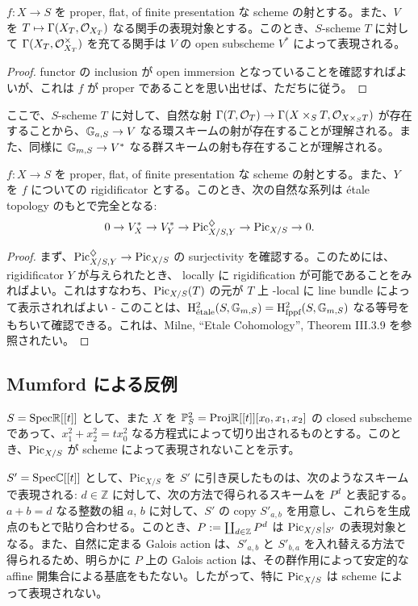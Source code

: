 \begin{prop}
  $f \colon X \to S$ を proper, flat, of finite presentation な scheme の射とする。また、$V$ を $T \mapsto \Gamma(X_T, \mathcal{O}_{X_T})$ なる関手の表現対象とする。このとき、$S$-scheme $T$ に対して $\Gamma(X_T, \mathcal{O}_{X_T}^\times)$ を充てる関手は $V$ の open subscheme $V^*$ によって表現される。
\end{prop}
\begin{proof}
  functor の inclusion が open immersion となっていることを確認すればよいが、これは $f$ が proper であることを思い出せば、ただちに従う。
\end{proof}

ここで、$S$-scheme $T$ に対して、自然な射 $\Gamma(T, \mathcal{O}_T) \to \Gamma(X \times_S T, \mathcal{O}_{X \times_S T})$ が存在することから、$\mathbb{G}_{a,S} \to V$ なる環スキームの射が存在することが理解される。また、同様に $\mathbb{G}_{m,S} \to V^*$ なる群スキームの射も存在することが理解される。

\begin{prop}\label{Prop:Rigid_vs_Natural_Pic}
  $f \colon X \to S$ を proper, flat, of finite presentation な scheme の射とする。また、$Y$ を $f$ についての rigidificator とする。このとき、次の自然な系列は \'{e}tale topology のもとで完全となる: \[0 \to V_X^* \to V_Y^* \to \mathrm{Pic}^\diamondsuit_{X / S, Y} \to \mathrm{Pic}_{X / S} \to 0.\]
\end{prop}
\begin{proof}
  まず、$\mathrm{Pic}^\diamondsuit_{X / S, Y} \to \mathrm{Pic}_{X / S}$ の surjectivity を確認する。このためには、rigidificator $Y$ が与えられたとき、 locally に rigidification が可能であることをみればよい。これはすなわち、$\mathrm{Pic}_{X / S}(T)$ の元が $T$ 上 -local に line bundle によって表示されればよい - このことは、$\mathrm{H}^2_{\text{\'etale}}(S, \mathbb{G}_{m,S}) = \mathrm{H}^2_{\text{fppf}}(S, \mathbb{G}_{m,S})$ なる等号をもちいて確認できる。これは、Milne, ``Etale Cohomology'', Theorem III.3.9 を参照されたい。
\end{proof}

\subsection{Mumford による反例}
$S = \mathrm{Spec} \mathbb{R}[[t]]$ として、また $X$ を $\mathbb{P}^2_S = \mathrm{Proj} \mathbb{R}[[t]][x_0, x_1, x_2]$ の closed subscheme であって、$x_1^2 + x_2^2 = tx_0^2$ なる方程式によって切り出されるものとする。このとき、$\mathrm{Pic}_{X / S}$ が scheme によって表現されないことを示す。

$S' = \mathrm{Spec} \mathbb{C}[[t]]$ として、$\mathrm{Pic}_{X / S}$ を $S'$ に引き戻したものは、次のようなスキームで表現される: $d \in \mathbb{Z}$ に対して、次の方法で得られるスキームを $P^d$ と表記する。$a + b = d$ なる整数の組 $a$, $b$ に対して、$S'$ の copy $S'_{a, b}$ を用意し、これらを生成点のもとで貼り合わせる。このとき、$P := \coprod_{d \in \mathbb{Z}} P^d$ は $\mathrm{Pic}_{X / S}|_{S'}$ の表現対象となる。また、自然に定まる Galois action は、$S'_{a, b}$ と $S'_{b, a}$ を入れ替える方法で得られるため、明らかに $P$ 上の Galois action は、その群作用によって安定的な affine 開集合による基底をもたない。したがって、特に $\mathrm{Pic}_{X / S}$ は scheme によって表現されない。

